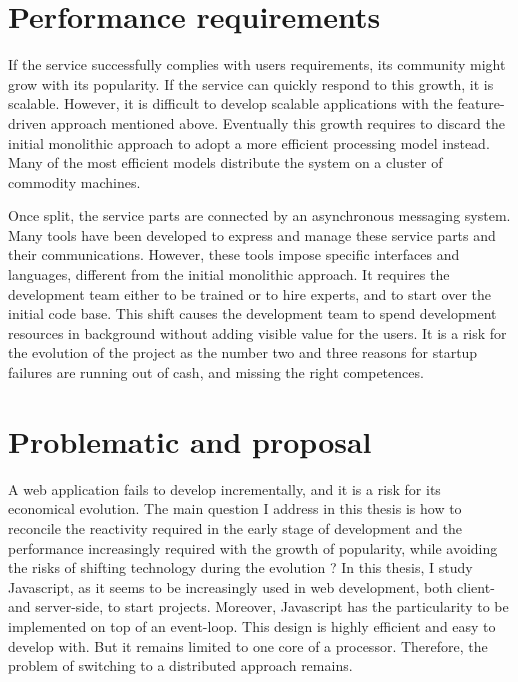 \section{Performance requirements}

If the service successfully complies with users requirements, its community might grow with its popularity.
If the service can quickly respond to this growth, it is scalable.
However, it is difficult to develop scalable applications with the feature-driven approach mentioned above.
Eventually this growth requires to discard the initial monolithic approach to adopt a more efficient processing model instead.
Many of the most efficient models distribute the system on a cluster of commodity machines.

Once split, the service parts are connected by an asynchronous messaging system.
Many tools have been developed to express and manage these service parts and their communications.
However, these tools impose specific interfaces and languages, different from the initial monolithic approach.
It requires the development team either to be trained or to hire experts, and to start over the initial code base.
This shift causes the development team to spend development resources in background without adding visible value for the users.
It is a risk for the evolution of the project as the number two and three reasons for startup failures are running out of cash, and missing the right competences.

\section{Problematic and proposal}

A web application fails to develop incrementally, and it is a risk for its economical evolution.
The main question I address in this thesis is how to reconcile the reactivity required in the early stage of development and the performance increasingly required with the growth of popularity, while avoiding the risks of shifting technology during the evolution ?
In this thesis, I study Javascript, as it seems to be increasingly used in web development, both client- and server-side, to start projects.
Moreover, Javascript has the particularity to be implemented on top of an event-loop.
This design is highly efficient and easy to develop with.
But it remains limited to one core of a processor.
Therefore, the problem of switching to a distributed approach remains.

